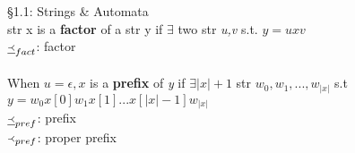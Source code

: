 \documentclass[12pt]{article}
\date{} %
\begin{document}
\S{1.1: Strings \& Automata}\\
str x is a \textbf{factor} of a str y if $\exists$ two str \textit{u,v} s.t. $y= uxv$\\
$\underline{\Yleft}_{fact}$: factor\\
\ \\

When $u = \epsilon, x$ is a \textbf{prefix} of \textit{y} if $\exists |x| + 1$ str $w_{0}, w_{1}, ..., w_{|x|}$ s.t\\ 
$y=w_{0}x[0] w_{1}x[1]...x[|x|-1]w_{|x|}$\\
$\underline{\Yleft}_{pref}$: prefix\\
$\Yleft_{pref}$: proper prefix\\
\end{document}
